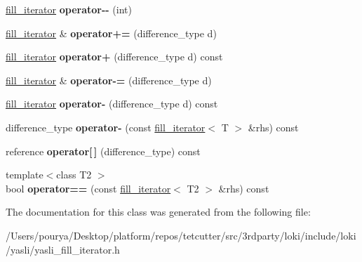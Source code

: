 \begin{DoxyCompactItemize}
\item 
\hypertarget{classyasli__nstd_1_1fill__iterator_a6acf76b0fcc631aacb07dfc1d1aef457}{}\hyperlink{classyasli__nstd_1_1fill__iterator}{fill\+\_\+iterator} {\bfseries operator-\/-\/} (int)\label{classyasli__nstd_1_1fill__iterator_a6acf76b0fcc631aacb07dfc1d1aef457}

\item 
\hypertarget{classyasli__nstd_1_1fill__iterator_a2335b8f1e69f1fc2f8354e4c9b56c39f}{}\hyperlink{classyasli__nstd_1_1fill__iterator}{fill\+\_\+iterator} \& {\bfseries operator+=} (difference\+\_\+type d)\label{classyasli__nstd_1_1fill__iterator_a2335b8f1e69f1fc2f8354e4c9b56c39f}

\item 
\hypertarget{classyasli__nstd_1_1fill__iterator_a06ea518f9d9de730898468437b04a8b2}{}\hyperlink{classyasli__nstd_1_1fill__iterator}{fill\+\_\+iterator} {\bfseries operator+} (difference\+\_\+type d) const \label{classyasli__nstd_1_1fill__iterator_a06ea518f9d9de730898468437b04a8b2}

\item 
\hypertarget{classyasli__nstd_1_1fill__iterator_ac35bacb3d0dc082a35fe42e575123a07}{}\hyperlink{classyasli__nstd_1_1fill__iterator}{fill\+\_\+iterator} \& {\bfseries operator-\/=} (difference\+\_\+type d)\label{classyasli__nstd_1_1fill__iterator_ac35bacb3d0dc082a35fe42e575123a07}

\item 
\hypertarget{classyasli__nstd_1_1fill__iterator_afeedfa193a19788196a13b99d96342f6}{}\hyperlink{classyasli__nstd_1_1fill__iterator}{fill\+\_\+iterator} {\bfseries operator-\/} (difference\+\_\+type d) const \label{classyasli__nstd_1_1fill__iterator_afeedfa193a19788196a13b99d96342f6}

\item 
\hypertarget{classyasli__nstd_1_1fill__iterator_a6d10b28f5ed28d747a9df62d9e0aa01e}{}difference\+\_\+type {\bfseries operator-\/} (const \hyperlink{classyasli__nstd_1_1fill__iterator}{fill\+\_\+iterator}$<$ T $>$ \&rhs) const \label{classyasli__nstd_1_1fill__iterator_a6d10b28f5ed28d747a9df62d9e0aa01e}

\item 
\hypertarget{classyasli__nstd_1_1fill__iterator_ad39a7d43038ba565f83292ee8e510b0c}{}reference {\bfseries operator\mbox{[}$\,$\mbox{]}} (difference\+\_\+type) const \label{classyasli__nstd_1_1fill__iterator_ad39a7d43038ba565f83292ee8e510b0c}

\item 
\hypertarget{classyasli__nstd_1_1fill__iterator_a712598b624d6909760e36a769f0ac9c6}{}{\footnotesize template$<$class T2 $>$ }\\bool {\bfseries operator==} (const \hyperlink{classyasli__nstd_1_1fill__iterator}{fill\+\_\+iterator}$<$ T2 $>$ \&rhs) const \label{classyasli__nstd_1_1fill__iterator_a712598b624d6909760e36a769f0ac9c6}

\end{DoxyCompactItemize}


The documentation for this class was generated from the following file\+:\begin{DoxyCompactItemize}
\item 
/\+Users/pourya/\+Desktop/platform/repos/tetcutter/src/3rdparty/loki/include/loki/yasli/yasli\+\_\+fill\+\_\+iterator.\+h\end{DoxyCompactItemize}
